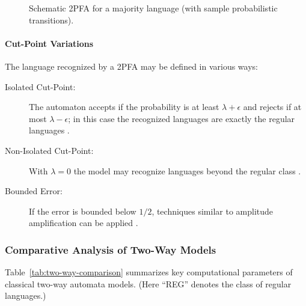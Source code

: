 \begin{figure}[h]
    \centering  
    \caption{Schematic 2PFA for a majority language (with sample probabilistic transitions).}
    \label{fig:2pfa-example}
\end{figure}

\paragraph{Cut-Point Variations}
The language recognized by a 2PFA may be defined in various ways:
\begin{description}
    \item[Isolated Cut-Point:] The automaton accepts if the probability is at least \(\lambda+\epsilon\) and rejects if at most \(\lambda-\epsilon\); in this case the recognized languages are exactly the regular languages \cite{rabin1963probabilistic}.
    \item[Non-Isolated Cut-Point:] With \(\lambda=0\) the model may recognize languages beyond the regular class \cite{paz1971introduction}.
    \item[Bounded Error:] If the error is bounded below \(1/2\), techniques similar to amplitude amplification can be applied \cite{nielsen2010quantum}.
\end{description}

\subsubsection{Comparative Analysis of Two-Way Models}
\label{subsubsec:two-way-comparison}

Table~\ref{tab:two-way-comparison} summarizes key computational parameters of classical two-way automata models. (Here “REG” denotes the class of regular languages.)

